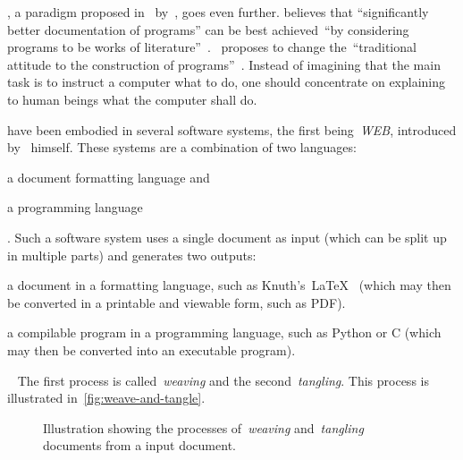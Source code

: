 \documentclass[%
    a4paper,    %
    justified,  %
    nobib,      %
    openany     %
]{tufte-book}
\makeatletter
\renewcommand{\label}[1]{\@tufte@label{##1}}%
\makeatother
\begin{document}
, a paradigm proposed
in~\citeyear{knuth-lp-1984} by~, goes even further.
 believes that \enquote{significantly better
documentation of programs} can be best achieved~\enquote{by considering programs
to be works of literature}~\cite[p.
1]{knuth-lp-1984}.~ proposes to change
the~\enquote{traditional attitude to the construction of programs}~\cite[p.
1]{knuth-lp-1984}. Instead of imagining that the main task is to instruct a
computer what to do, one should concentrate on explaining to human beings what
the computer shall do.~\cite[p. 1]{knuth-lp-1984}

 have been embodied in several
software systems, the first being~\emph{WEB}, introduced
by~ himself. These systems are a combination of two
languages:
\begin{enumerate*}
  \item a document formatting language and
  \item a programming language
\end{enumerate*}.
Such a software system uses a single document as input (which can be split up in
multiple parts) and generates two outputs:
\begin{enumerate*}
  \item a document in a formatting language, such as
    Knuth's~\LaTeX{}~\cite{knuth-tex-1987} (which may then be converted in a
    printable and viewable form, such as PDF).
  \item a compilable program in a programming language, such as Python or C
    (which may then be converted into an executable program).
\end{enumerate*}~\cite{knuth-lp-1984}
The first process is called~\emph{weaving} and the second~\emph{tangling}. This
process is illustrated in~\autoref{fig:weave-and-tangle}.

\begin{figure}
  \label{fig:weave-and-tangle}
  \caption{Illustration showing the processes of~\emph{weaving}
    and~\emph{tangling} documents from a input document.~\cite{knuth-lp-1984}}
\end{figure}
\end{document}
